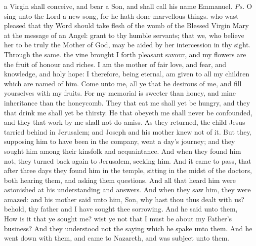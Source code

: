 
\introit
{} a Virgin shall conceive, and bear a Son, and shall call his name Emmanuel. \textit{Ps.} O sing unto the Lord a new song, for he hath done marvellous things.
\collect
{} who wast pleased that thy Word should take flesh of the womb of the Blessed Virgin Mary at the message of an Angel: grant to thy humble servants; that we, who believe her to be truly the Mother of God, may be aided by her intercession in thy sight. Through the same.
 the vine brought I forth pleasant savour, and my flowers are the fruit of honour and riches. I am the mother of fair love, and fear, and knowledge, and holy hope: I therefore, being eternal, am given to all my children which are named of him. Come unto me, all ye that be desirous of me, and fill yourselves with my fruits. For my memorial is sweeter than honey, and mine inheritance than the honeycomb. They that eat me shall yet be hungry, and they that drink me shall yet be thirsty. He that obeyeth me shall never be confounded, and they that work by me shall not do amiss.
 As they returned, the child Jesus tarried behind in Jerusalem; and Joseph and his mother knew not of it. But they, supposing him to have been in the company, went a day's journey; and they sought him among their kinsfolk and acquaintance. And when they found him not, they turned back again to Jerusalem, seeking him. And it came to pass, that after three days they found him in the temple, sitting in the midst of the doctors, both hearing them, and asking them questions. And all that heard him were astonished at his understanding and answers. And when they saw him, they were amazed: and his mother said unto him, Son, why hast thou thus dealt with us? behold, thy father and I have sought thee sorrowing. And he said unto them, How is it that ye sought me? wist ye not that I must be about my Father's business? And they understood not the saying which he spake unto them. And he went down with them, and came to Nazareth, and was subject unto them.
